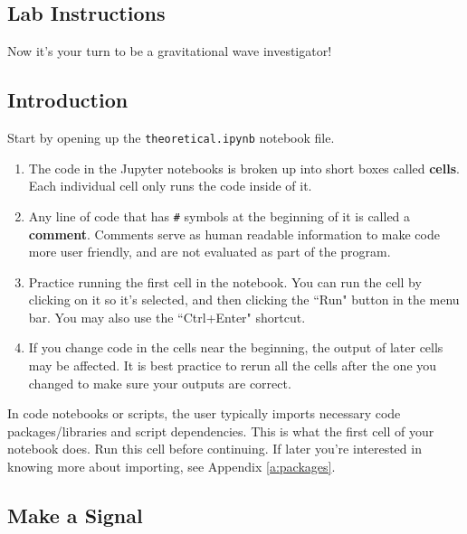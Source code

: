 \documentclass[14pt]{article}
\begin{document}



\newpage

\subsection{Lab Instructions}
Now it's your turn to be a gravitational wave investigator!
\subsection*{Introduction}
Start by opening up the \texttt{theoretical.ipynb} notebook file.
    \begin{enumerate}
    \item The code in the Jupyter notebooks is broken up into short boxes called \textbf{cells}. Each individual cell only runs the code inside of it.
    \item Any line of code that has \texttt{\#} symbols at the beginning of it is called a \textbf{comment}. Comments serve as human readable information to make code more user friendly, and are not evaluated as part of the program.
    \item Practice running the first cell in the notebook. You can run the cell by clicking on it so it's selected, and then clicking the ``Run" button in the menu bar. You may also use the ``Ctrl+Enter" shortcut.
    \item If you change code in the cells near the beginning, the output of later cells may be affected. It is best practice to rerun all the cells after the one you changed to make sure your outputs are correct.
    \end{enumerate}
In code notebooks or scripts, the user typically imports necessary code packages/libraries and script dependencies. This is what the first cell of your notebook does. Run this cell before continuing. If later you're interested in knowing more about importing, see Appendix \ref{a:packages}.

\subsection*{Make a Signal}
\end{document}
